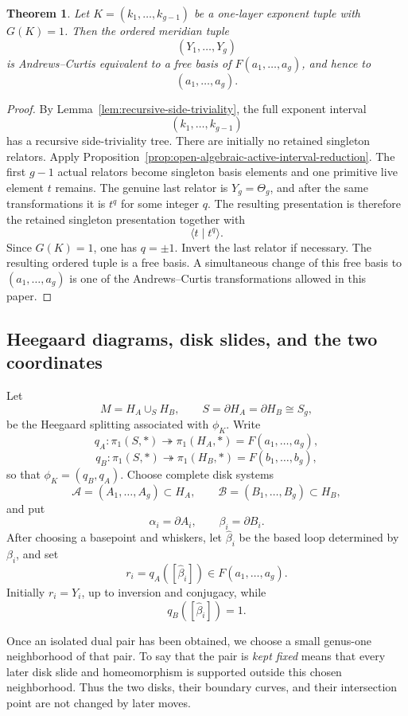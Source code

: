 \documentclass{article}
\newtheorem{theorem}{Theorem}[section]
\begin{document}
\begin{theorem}
\label{thm:recursive-tree-AC-reduction}
Let $K=(k_1,\ldots,k_{g-1})$ be a one-layer exponent tuple with
$G(K)=1$.  Then the ordered meridian tuple
\[
 (Y_1,\ldots,Y_g)
\]
is Andrews--Curtis equivalent to a free basis of
$F(a_1,\ldots,a_g)$, and hence to
\[
 (a_1,\ldots,a_g).
\]
\end{theorem}

\begin{proof}
By Lemma~\ref{lem:recursive-side-triviality}, the full exponent interval
\[
 (k_1,\ldots,k_{g-1})
\]
has a recursive side-triviality tree.  There are initially no retained
singleton relators.  Apply
Proposition~\ref{prop:open-algebraic-active-interval-reduction}.  The first
$g-1$ actual relators become singleton basis elements and one primitive live
element $t$ remains.  The genuine last relator is $Y_g=\Theta_g$, and after
the same transformations it is $t^q$ for some integer $q$.  The resulting
presentation is therefore the retained singleton presentation together with
\[
 \langle t\mid t^q\rangle.
\]
Since $G(K)=1$, one has $q=\pm1$.  Invert the last relator if necessary.
The resulting ordered tuple is a free basis.  A simultaneous change of this
free basis to $(a_1,\ldots,a_g)$ is one of the Andrews--Curtis
transformations allowed in this paper.
\end{proof}

\subsection{Heegaard diagrams, disk slides, and the two coordinates}

Let
\[
 M=H_A\cup_S H_B,
 \qquad S=\partial H_A=\partial H_B\cong S_g,
\]
be the Heegaard splitting associated with \(\phi_K\).  Write
\[
 q_A:\pi_1(S,*)\twoheadrightarrow\pi_1(H_A,*)=F(a_1,\ldots,a_g),
\]
\[
 q_B:\pi_1(S,*)\twoheadrightarrow\pi_1(H_B,*)=F(b_1,\ldots,b_g),
\]
so that \(\phi_K=(q_B,q_A)\).  Choose complete disk systems
\[
 \mathcal A=(A_1,\ldots,A_g)\subset H_A,
 \qquad
 \mathcal B=(B_1,\ldots,B_g)\subset H_B,
\]
and put
\[
 \alpha_i=\partial A_i,
 \qquad
 \beta_i=\partial B_i.
\]
After choosing a basepoint and whiskers, let \(\widehat\beta_i\) be the based
loop determined by \(\beta_i\), and set
\[
 r_i=q_A([\widehat\beta_i])\in F(a_1,\ldots,a_g).
\]
Initially \(r_i=Y_i\), up to inversion and conjugacy, while
\[
 q_B([\widehat\beta_i])=1.
\]

Once an isolated dual pair has been obtained, we choose a small genus-one
neighborhood of that pair.  To say that the pair is \emph{kept fixed} means
that every later disk slide and homeomorphism is supported outside this
chosen neighborhood.  Thus the two disks, their boundary curves, and their
intersection point are not changed by later moves.
\end{document}
